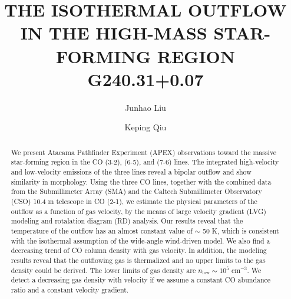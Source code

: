 \documentclass[twocolumn]{aastex61}
\begin{document}
\title{THE ISOTHERMAL OUTFLOW IN THE HIGH-MASS STAR-FORMING REGION G240.31+0.07}




\author{Junhao Liu}

\author{Keping Qiu}

\begin{abstract}
We present Atacama Pathfinder Experiment (APEX) observations toward the massive star-forming region  in the CO (3-2), (6-5), and (7-6) lines. The integrated high-velocity and low-velocity emissions of the three lines reveal a bipolar outflow and show similarity in morphology. Using the three CO lines, together with the combined data from the Submillimeter Array (SMA) and the Caltech Submillimeter Observatory (CSO) 10.4 m telescope in CO (2-1), we estimate the physical parameters of the  outflow as a function of gas velocity, by the means of large velocity gradient (LVG) modeling and rotalation diagram (RD) analysis. Our results reveal that the temperature of the outflow has an almost constant value of $\sim$ 50 K, which is consistent with the isothermal assumption of the wide-angle wind-driven model. We also find a decreasing trend of CO column density with gas velocity. In addition, the modeling results reveal that the outflowing gas is thermalized and no upper limits to the gas density could be derived. The lower limits of gas density are $n_{\mathrm{low}} \sim 10^5$ cm$^{-3}$. We detect a decreasing gas density with velocity if we assume a constant CO abundance ratio and a constant velocity gradient.
\end{abstract}







\end{document}
